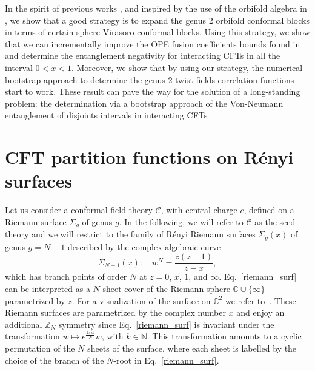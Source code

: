 \documentclass[a4paper,11pt]{article}
\begin{document}
In the spirit of previous works \cite{Rajabpour, Ruggiero}, and inspired by the use of the orbifold algebra in \cite{Dupic}, we show that a good strategy is to expand the genus 2 orbifold conformal blocks in terms of certain sphere Virasoro conformal blocks.
Using this strategy, we show that we can incrementally improve  the OPE fusion coefficients bounds found in \cite{Collier} and determine the entanglement negativity for interacting CFTs in all the interval $0<x<1$. Moreover, we show that by using  our strategy, the numerical bootstrap approach to determine the genus 2 twist fields correlation functions start to work. These result can pave the way for the solution of a long-standing problem: the determination via a bootstrap approach of the Von-Neumann entanglement of disjoints intervals in interacting CFTs
\section{CFT partition functions on R\'enyi surfaces}
Let us consider a conformal field theory $\mathcal{C}$, with central charge 
$c$, defined on a Riemann surface $\Sigma_g$ of genus $g$. In the following, 
we will refer to $\mathcal{C}$ as the seed theory and we will restrict to the 
family of R\'enyi Riemann surfaces $\Sigma_g(x)$ of genus $g=N-1$ described 
by the  complex algebraic curve
\begin{equation}\label{riemann_surf}
\Sigma_{N-1}(x): \quad  w^N=\frac{z(z-1)}{z-x},
\end{equation}
which has branch points of order $N$ at $z=0$, $x$, $1$, and $\infty$. 
Eq.~\eqref{riemann_surf} can be interpreted as a $N$-sheet cover of the Riemann sphere $\mathbb C\cup \{\infty\}$ parametrized by $z$. For a visualization of the surface on $\mathbb C^2$ we refer to~\cite{Dubrovin}. These Riemann surfaces are parametrized by  
the complex number $x$ and enjoy an additional $\mathbb{Z}_N$ symmetry since 
Eq.~\eqref{riemann_surf} is invariant under the transformation 
$w\mapsto e^{\frac{2\pi i k}{N}}w$, with $k\in\mathbb{N}$. 
This transformation amounts to a cyclic permutation of the $N$ sheets of the surface, where each sheet is labelled by the choice of the branch of the $N$-root in Eq.~\eqref{riemann_surf}. 
\end{document}
